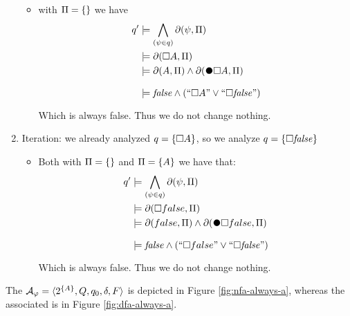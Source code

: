 \begin{example}
\begin{enumerate}
\begin{itemize}
			\item \label{exa:always-A_it-1_prop-empty} with $\Pi = \{\}$ we have 
			\begin{align*}
			q' &\models \bigwedge_{(\psi\in q)} \Dfun{\psi}\\
			&\models \Dfun{\Box A}\\
			&\models \Dfun{A} \lAND \Dfun{\Wnext \Box A}\\
			&\models \false \lAND (``\Box A" \lOR ``\Box \false")
			\end{align*}
			Which is always false. Thus we do not change nothing.
		\end{itemize}
		\item \label{exa:always-A_it-2} Iteration: we already analyzed $q = \{\Box A\}$, so we analyze $q = \{\Box \mathit{false}\}$
		\begin{itemize}			
			\item Both with $\Pi = \{\}$ and $\Pi = \{A\}$ we have that:
			\begin{align*}
			q' &\models \bigwedge_{(\psi\in q)} \Dfun{\psi}\\
			&\models \Dfun{\Box false}\\
			&\models \Dfun{false} \lAND \Dfun{\Wnext \Box false}\\
			&\models \false \lAND (``\Box false" \lOR ``\Box \false")
			\end{align*}
			Which is always false. Thus we do not change nothing.
		\end{itemize}
	\end{enumerate}
	
	The \NFA $\mathcal{A}_\varphi = \langle 2^{\{A\}}, Q, q_0, \delta, F \rangle$ is depicted in Figure \ref{fig:nfa-always-a}, whereas the associated \DFA is in Figure \ref{fig:dfa-always-a}.
	

\end{example}
